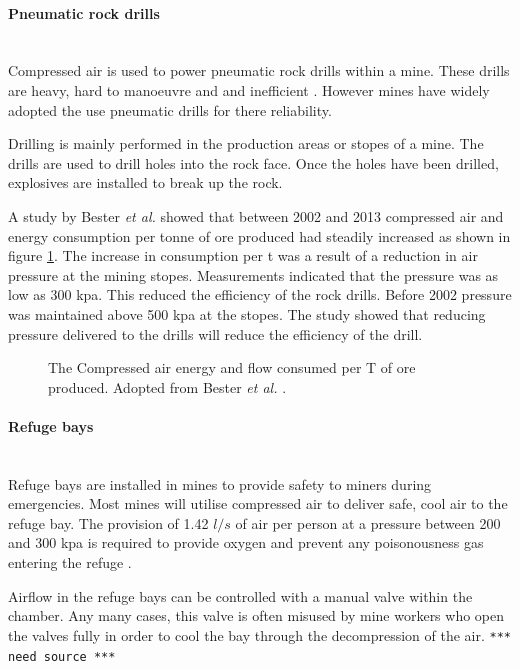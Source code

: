 	\paragraph*{Pneumatic rock drills}\leavevmode\\
	Compressed air is used to power pneumatic rock drills within a mine. These drills are heavy, hard to manoeuvre and  and inefficient \cite{van2008development}. However mines have widely adopted the use pneumatic drills for there reliability. \par
	Drilling is mainly performed in the production areas or stopes of a mine. The drills are used to drill holes into the rock face. Once the holes have been drilled, explosives are installed to break up the rock.\par
	A study by  Bester \textit{et al.} showed that between 2002 and 2013 compressed air and energy consumption per tonne of ore produced had steadily increased as shown in figure \ref{fig: Compressed energy and air flow per ton}. The increase in consumption per \gls{t} was a result of a reduction in air pressure at the mining stopes. Measurements indicated that the pressure was as low as 300 \gls{kpa}. This reduced the efficiency of the rock drills. Before 2002 pressure was maintained above 500 \gls{kpa} at the stopes.  The study showed that reducing pressure delivered to the drills will reduce the efficiency of the drill.\cite{bester2013effect} \par
		\begin{figure}[h]
		\centering
		\fbox{}
		\caption[The Compressed air energy and flow consumed per T of ore produced.]{The Compressed air energy and flow consumed per T of ore produced. Adopted from Bester \textit{et al.} \cite{bester2013effect}.}
		\label{fig: Compressed energy and air flow per ton}
	\end{figure}

\paragraph*{Refuge bays}\leavevmode\\
Refuge bays are installed in mines to provide safety to miners during emergencies. Most mines will utilise compressed air to deliver safe, cool air to the refuge bay. The provision of 1.42 $l/s$ of air per person at a pressure between 200 and 300 \gls{kpa} is required to provide oxygen and prevent any poisonousness gas entering the refuge \cite{brake1999criteria}.\par
Airflow in the refuge bays can be controlled with a manual valve within the chamber. Any many cases, this valve is often misused by mine workers who open the valves fully in order to cool the bay through the decompression of the air. \texttt{*** need source ***}
